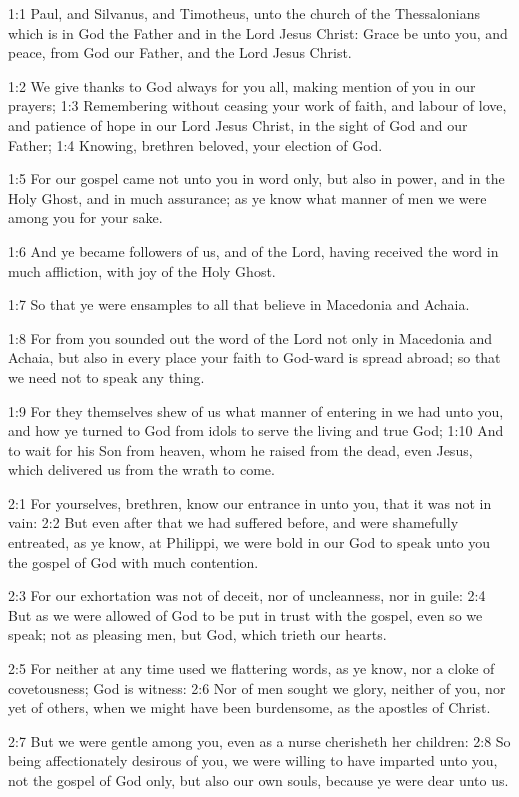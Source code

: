 

1:1 Paul, and Silvanus, and Timotheus, unto the church of the
Thessalonians which is in God the Father and in the Lord Jesus Christ:
Grace be unto you, and peace, from God our Father, and the Lord Jesus
Christ.

1:2 We give thanks to God always for you all, making mention of you in
our prayers; 1:3 Remembering without ceasing your work of faith, and
labour of love, and patience of hope in our Lord Jesus Christ, in the
sight of God and our Father; 1:4 Knowing, brethren beloved, your
election of God.

1:5 For our gospel came not unto you in word only, but also in power,
and in the Holy Ghost, and in much assurance; as ye know what manner
of men we were among you for your sake.

1:6 And ye became followers of us, and of the Lord, having received
the word in much affliction, with joy of the Holy Ghost.

1:7 So that ye were ensamples to all that believe in Macedonia and
Achaia.

1:8 For from you sounded out the word of the Lord not only in
Macedonia and Achaia, but also in every place your faith to God-ward
is spread abroad; so that we need not to speak any thing.

1:9 For they themselves shew of us what manner of entering in we had
unto you, and how ye turned to God from idols to serve the living and
true God; 1:10 And to wait for his Son from heaven, whom he raised
from the dead, even Jesus, which delivered us from the wrath to come.

2:1 For yourselves, brethren, know our entrance in unto you, that it
was not in vain: 2:2 But even after that we had suffered before, and
were shamefully entreated, as ye know, at Philippi, we were bold in
our God to speak unto you the gospel of God with much contention.

2:3 For our exhortation was not of deceit, nor of uncleanness, nor in
guile: 2:4 But as we were allowed of God to be put in trust with the
gospel, even so we speak; not as pleasing men, but God, which trieth
our hearts.

2:5 For neither at any time used we flattering words, as ye know, nor
a cloke of covetousness; God is witness: 2:6 Nor of men sought we
glory, neither of you, nor yet of others, when we might have been
burdensome, as the apostles of Christ.

2:7 But we were gentle among you, even as a nurse cherisheth her
children: 2:8 So being affectionately desirous of you, we were willing
to have imparted unto you, not the gospel of God only, but also our
own souls, because ye were dear unto us.

